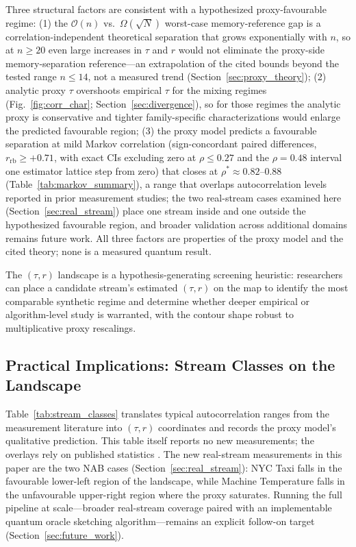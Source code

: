 \documentclass[sensors,article,submit,pdftex,moreauthors]{Definitions/mdpi}
\newcommand{\bigO}{\mathcal{O}}
\begin{document}
Three structural factors are consistent with a hypothesized proxy-favourable regime: (1) the $\bigO(n)$ vs.\ $\Omega(\sqrt{N})$ worst-case memory-reference gap is a correlation-independent theoretical separation that grows exponentially with $n$, so at $n \geq 20$ even large increases in $\tau$ and $r$ would not eliminate the proxy-side memory-separation reference---an extrapolation of the cited bounds beyond the tested range $n \leq 14$, not a measured trend (Section~\ref{sec:proxy_theory}); (2) analytic proxy $\tau$ overshoots empirical $\tau$ for the mixing regimes (Fig.~\ref{fig:corr_char}; Section~\ref{sec:divergence}), so for those regimes the analytic proxy is conservative and tighter family-specific characterizations would enlarge the predicted favourable region; (3) the proxy model predicts a favourable separation at mild Markov correlation (sign-concordant paired differences, $r_{\mathrm{rb}} \geq +0.71$, with exact CIs excluding zero at $\rho \leq 0.27$ and the $\rho = 0.48$ interval one estimator lattice step from zero) that closes at $\rho^{*} \approx 0.82$--$0.88$ (Table~\ref{tab:markov_summary}), a range that overlaps autocorrelation levels reported in prior measurement studies; the two real-stream cases examined here (Section~\ref{sec:real_stream}) place one stream inside and one outside the hypothesized favourable region, and broader validation across additional domains remains future work. All three factors are properties of the proxy model and the cited theory; none is a measured quantum result.

The $(\tau, r)$ landscape is a hypothesis-generating screening heuristic: researchers can place a candidate stream's estimated $(\tau, r)$ on the map to identify the most comparable synthetic regime and determine whether deeper empirical or algorithm-level study is warranted, with the contour shape robust to multiplicative proxy rescalings.

\subsection{Practical Implications: Stream Classes on the Landscape}
\label{sec:practical_impl}

Table~\ref{tab:stream_classes} translates typical autocorrelation ranges from the measurement literature into $(\tau, r)$ coordinates and records the proxy model's qualitative prediction. This table itself reports no new measurements; the overlays rely on published statistics \citep{leland1994ethernet,willinger1997selfsimilarity,beran1994statistics,su2024elasticonline,yan2024bidynamic,gama2014driftsurvey,arora2024driftreview}. The new real-stream measurements in this paper are the two NAB cases (Section~\ref{sec:real_stream}): NYC Taxi falls in the favourable lower-left region of the landscape, while Machine Temperature falls in the unfavourable upper-right region where the proxy saturates. Running the full pipeline at scale---broader real-stream coverage paired with an implementable quantum oracle sketching algorithm---remains an explicit follow-on target (Section~\ref{sec:future_work}).
\end{document}
